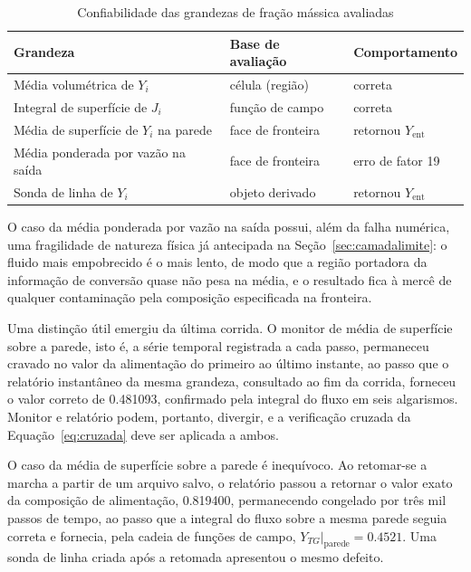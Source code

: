 \begin{table}[htb]
\centering
\caption{Confiabilidade das grandezas de fração mássica avaliadas}
\label{tab:reports}
\begin{tabular}{l l l}
\toprule
Grandeza & Base de avaliação & Comportamento \\
\midrule
Média volumétrica de $Y_i$              & célula (região)        & correta \\
Integral de superfície de $J_i$         & função de campo        & correta \\
Média de superfície de $Y_i$ na parede  & face de fronteira      & retornou $Y_{\text{ent}}$ \\
Média ponderada por vazão na saída      & face de fronteira      & erro de fator \num{19} \\
Sonda de linha de $Y_i$                 & objeto derivado        & retornou $Y_{\text{ent}}$ \\
\bottomrule
\end{tabular}
\end{table}

O caso da média ponderada por vazão na saída possui, além da falha numérica, uma
fragilidade de natureza física já antecipada na Seção~\ref{sec:camadalimite}: o
fluido mais empobrecido é o mais lento, de modo que a região portadora da
informação de conversão quase não pesa na média, e o resultado fica à mercê de
qualquer contaminação pela composição especificada na fronteira.

Uma distinção útil emergiu da última corrida. O monitor de média de superfície
sobre a parede, isto é, a série temporal registrada a cada passo, permaneceu
cravado no valor da alimentação do primeiro ao último instante, ao passo que o
relatório instantâneo da mesma grandeza, consultado ao fim da corrida, forneceu
o valor correto de \num{0.481093}, confirmado pela integral do fluxo em seis
algarismos. Monitor e relatório podem, portanto, divergir, e a verificação
cruzada da Equação~\eqref{eq:cruzada} deve ser aplicada a ambos.

O caso da média de superfície sobre a parede é inequívoco. Ao retomar-se a
marcha a partir de um arquivo salvo, o relatório passou a retornar o valor exato
da composição de alimentação, \num{0.819400}, permanecendo congelado por três
mil passos de tempo, ao passo que a integral do fluxo sobre a mesma parede
seguia correta e fornecia, pela cadeia de funções de campo,
$Y_{TG}|_{\text{parede}} = \num{0.4521}$. Uma sonda de linha criada após a
retomada apresentou o mesmo defeito.

